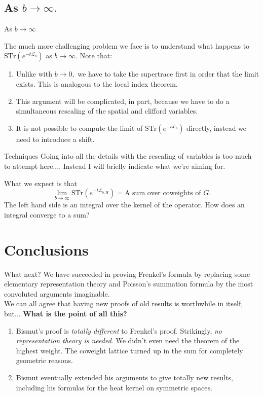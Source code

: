 \documentclass{beamer}
\numberwithin{equation}{section}
\theoremstyle{plain}
\theoremstyle{plain}
\theoremstyle{definition}
\theoremstyle{plain}
\theoremstyle{plain}
\theoremstyle{definition}
\newcommand{\Lc}{\mathcal{L}}
\newcommand{\Str}{\mathrm{STr}}
\begin{document}
\subsection{As $b\to \infty.$}

\begin{frame}
  \huge{As $b\to\infty$}
\end{frame}

\begin{frame}
  The much more challenging problem we face is to understand what happens to $\Str(e^{-t\Lc_b})$ as $b\to\infty.$
  Note that:
  \begin{enumerate}
    \item{} Unlike with $b\to 0,$ we have to take the supertrace first in order that the limit exists. This is analogous to the local index theorem. 
    \item{} This argument will be complicated, in part, because we have to do a simultaneous rescaling of the spatial and clifford variables.
    \item{} It is not possible to compute the limit of $\Str(e^{-t\Lc_b})$ directly, instead we need to introduce a shift.
  \end{enumerate}
\end{frame}

\begin{frame}{Techniques}
  Going into all the details with the rescaling of variables is too much to attempt here.... Instead I will briefly indicate what we're aiming for.
  
  What we expect is that
  \[
    \lim_{b\to\infty}\Str(e^{-t\Lc_{b,H}}) = \text{A sum over coweights of }G.
  \]
  The left hand side is an integral over the kernel of the operator. How does an integral converge to a sum?
  
\end{frame}

\section{Conclusions}

\begin{frame}{What next?}
  We have succeeded in proving Frenkel's formula by replacing some elementary representation theory and Poisson's summation formula by the most convoluted arguments imaginable. \\
  
  We can all agree that having new proofs of old results is worthwhile in itself, but...
  \textbf{What is the point of all this?}
  \begin{enumerate}
    \item{} Bismut's proof is \emph{totally different} to Frenkel's proof. Strikingly, \emph{no representation theory is needed}. We didn't even need the theorem of the highest weight. The coweight lattice turned up in the sum for completely geometric reasons.
    \item{} Bismut eventually extended his arguments to give totally new results, including his formulas for the heat kernel on symmetric spaces.
  \end{enumerate}
\end{frame}
\end{document}
